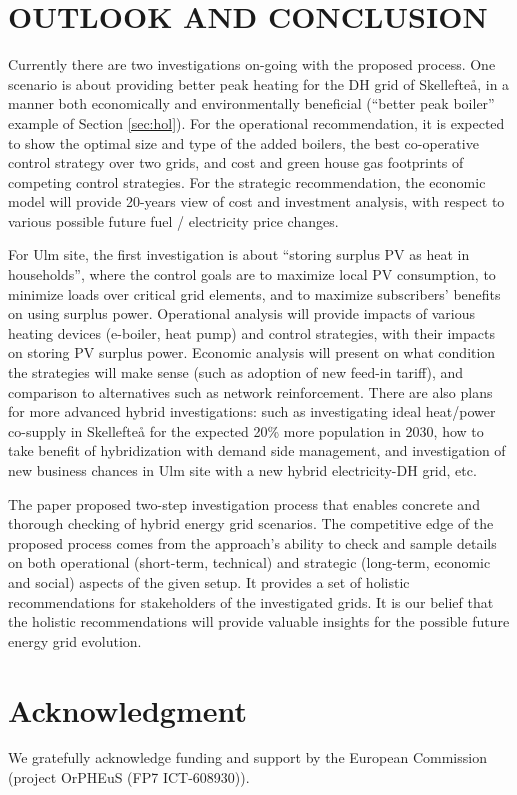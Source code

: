 \documentclass[review]{elsarticle}
\begin{document}
\section{\uppercase{Outlook and Conclusion}}
\label{sec:con} 
Currently there are two investigations on-going with the proposed 
process. One scenario is about providing better peak heating for the
DH grid of Skellefte{\aa}, in a manner both economically and
environmentally beneficial (``better peak boiler'' example of Section
\ref{sec:hol}). 
For the operational recommendation, it is expected to show the optimal
size and type of the added boilers, the best co-operative control
strategy over two grids, and cost and green house gas footprints
of competing control strategies. For the strategic recommendation, the
economic model will provide 20-years view of cost and investment
analysis, with respect to various possible future fuel / electricity
price changes. 

For Ulm site, the first investigation is about ``storing surplus PV as 
heat in households'', where the control goals are to maximize local 
PV consumption, to minimize loads over critical grid elements, and to 
maximize subscribers' benefits on using surplus power. Operational
analysis will provide impacts of various heating devices (e-boiler, 
heat pump) and control strategies, with their impacts on storing PV
surplus power. Economic analysis will present on what condition the 
strategies will make sense (such as adoption of new feed-in tariff),
and comparison to alternatives such as network reinforcement.  
There are also plans for more advanced hybrid investigations: such as  
investigating ideal heat/power co-supply in Skellefte{\aa} for the 
expected 20\% more population in 2030, how to take benefit of  
hybridization with demand side management, and investigation of new
business chances in Ulm site with a new hybrid electricity-DH grid, 
etc.

The paper proposed two-step investigation process that enables
concrete and thorough checking of hybrid energy grid scenarios. The
competitive edge of the proposed process comes from the approach's
ability to check and  sample details on both operational
(short-term, technical) and strategic (long-term, economic and
social) aspects of the given setup. It provides a set of holistic
recommendations for stakeholders of the investigated grids. It is our 
belief that the holistic recommendations will provide valuable
insights for the possible future energy grid evolution.


\section*{Acknowledgment}
We gratefully acknowledge funding and support by the European
Commission (project OrPHEuS (FP7 ICT-608930)). 



%

\end{document}
